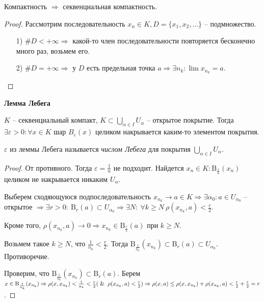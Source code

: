 \begin{corollary}
    Компактность $\Rightarrow$ секвенциальная компактность.
\end{corollary}

\begin{proof}
    Рассмотрим последовательность $x_n\in K, D=\{x_1, x_2, ...\}$ – подмножество.

    \begin{enumerate}
        \item[1)] $\# D<+\infty\Rightarrow$ какой-то член последовательности повторяется бесконечно много раз, возьмем его.
        \item[2)] $\# D=+\infty\Rightarrow$ у $D$ есть предельная точка  $a\Rightarrow \exists n_k:\lim x_{n_k}=a$. 
    \end{enumerate}
\end{proof}

\begin{lemma}
    \textbf{Лемма Лебега}

    $K$ – секвенциальный компакт, $K\subset \bigcup\limits_{\alpha \in I} U_\alpha$ – открытое покрытие. Тогда $\exists \varepsilon > 0:\forall x\in K$ шар $B_\varepsilon(x)$ целиком накрывается каким-то элементом покрытия.
\end{lemma}

\begin{definition}
    $\varepsilon$ из леммы Лебега называется \textit{числом Лебега} для покрытия $\bigcup\limits_{\alpha \in I} U_\alpha$.
\end{definition}

\begin{proof}
    От противного. Тогда $\varepsilon =\frac{1}{n}$ не подходит. Найдется $x_n\in K:\text{B}_{\frac{1}{n}}(x_n)$ целиком не накрывается никаким $U_\alpha$.

    Выберем сходяющуюся подпоследовательность $x_{n_k}\rightarrow a\in K\Rightarrow \exists \alpha_0:a\in U_{\alpha_0}$ – открытое $\Rightarrow \exists r>0:\ \text{B}_r(a)\subset U_{\alpha_0}\Rightarrow\exists N:\ \forall k\geq N\ \rho(x_{n_k}, a)<\frac{r}{2}$. 
    
    Кроме  того, $\rho(x_{n_k}, a)\rightarrow 0\Rightarrow x_{n_k}\in \text{B}_{\frac{r}{2}}(a)$ при $k\geq N$.

    Возьмем такое $k\geq N$, что $\frac{1}{n_k}<\frac{r}{2}$. Тогда $\text{B}_{\frac{1}{n_k}}(x_{n_k})\subset \text{B}_r(a)\subset U_{\alpha_0}$. Противоречие.

    Проверим, что $\text{B}_{\frac{1}{n_k}}(x_{n_k})\subset \text{B}_r(a)$. Берем $x\in \text{B}_{\frac{1}{n_k}}(x_{n_k})\Rightarrow \rho(x, x_{n_k})<\frac{1}{n_k}<\frac{r}{2}(\And \rho(x_{n_k}, a)<\frac{r}{2})\Rightarrow \rho(x, a)\leq \rho(x, x_{n_k})+\rho(x_{n_k}, a)<\frac{r}{2}+\frac{r}{2}=r$.
\end{proof}


